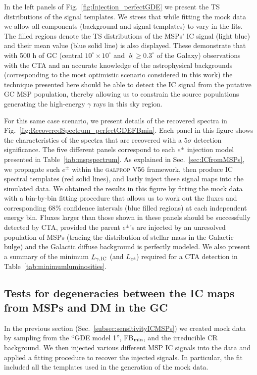 \documentclass[doublespace,draft,nopageskip]{VTthesis} %
\begin{document}
In the left panels of Fig.~\ref{fig:Injection_perfectGDE} we present the TS distributions of the signal templates. We stress that while fitting the mock data we allow all components (background and signal templates) to vary in the fits. The filled regions denote the TS distributions of the MSPs' IC signal (light blue) and their mean value (blue solid line) is also displayed. These demonstrate that with 500 h of GC (central $10^\circ\times10^\circ$ and $|b|\geq0.3^\circ$ of the Galaxy)  observations 
with the CTA
and an accurate knowledge of the astrophysical backgrounds (corresponding to the most optimistic scenario considered in this work) the technique presented here should be able to detect the IC signal from the putative GC MSP population, thereby allowing us to constrain the source populations generating the high-energy $\gamma$ rays in this sky region.




For this same case scenario, we present details of the recovered spectra in Fig.~\ref{fig:RecoveredSpectrum_perfectGDEFBmin}. Each panel in this figure shows the characteristics of the spectra that are recovered with a $5\sigma$ detection significance. The five different panels correspond to each $e^\pm$ injection model presented in Table~\ref{tab:mspspectrum}. As explained in Sec.~\ref{sec:ICfromMSPs}, we propagate such $e^\pm$ within the \textsc{galprop} V56 framework, then produce IC spectral templates (red solid lines), and lastly inject these signal maps into the simulated data. We obtained the results in this figure by fitting the mock data with a bin-by-bin fitting procedure that allows us to work out the fluxes and corresponding 68\% confidence intervals (blue filled regions) at each independent energy bin. Fluxes larger than those shown in these panels should be successfully detected by CTA, provided the parent $e^\pm$'s are injected by an unresolved population of MSPs (tracing the distribution of stellar mass in the Galactic bulge) and the Galactic diffuse background is perfectly modeled. We also present a summary of the minimum $L_{\gamma,{\rm IC}}$ (and $L_{e^\pm}$) 
required for a CTA detection in Table~\ref{tab:minimumluminosities}.

\subsection{Tests for degeneracies between the IC maps from MSPs and DM in the GC}
\label{subsec:degeneracyDMvsMSPs}

In the previous section (Sec.~\ref{subsec:sensitivityICMSPs}) we created mock data by sampling from the  ``GDE model 1'', FB$_{\rm min}$, and the irreducible CR background. We then injected various different MSP IC signals into the data and applied a fitting procedure to recover the injected signals. In particular, the fit included all the templates used in the generation of the mock data. 
\end{document}
